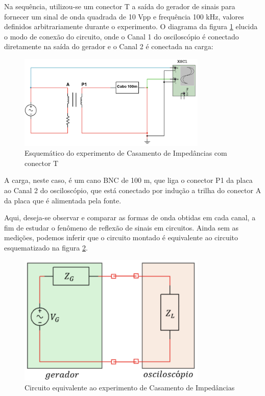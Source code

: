 \documentclass[12pt]{article}
\begin{document}
Na sequência, utilizou-se um conector T a saída do gerador de sinais
para fornecer um sinal de onda quadrada de 10 Vpp e frequência 100
kHz, valores definidos arbitrariamente durante o experimento. O
diagrama da figura \ref{fig:img/circuito3.png} elucida o modo de
conexão do circuito, onde o Canal 1
do osciloscópio é conectado diretamente na saída do gerador e o Canal
2 é conectada na carga:

\begin{figure}[H]
  \centering
  \includegraphics[width=0.8\textwidth]{img/circuito3.png}
  \caption{Esquemático do experimento de Casamento de Impedâncias com
  conector T}
  \label{fig:img/circuito3.png}
\end{figure}

A carga, neste caso, é um cano BNC de 100 m, que liga o conector P1
da placa ao Canal 2 do osciloscópio, que está conectado por indução a
trilha do conector A da placa que é alimentada pela fonte.

Aqui, deseja-se observar e comparar as formas de onda obtidas em cada
canal, a fim de estudar o fenômeno de reflexão de sinais em
circuitos. Ainda sem as medições, podemos inferir que o circuito
montado é equivalente ao circuito esquematizado na figura
\ref{fig:img/circuito4.png}.

\begin{figure}[H]
  \centering
  \includegraphics[width=0.8\textwidth]{img/circuito4.png}
  \caption{Circuito equivalente ao experimento de Casamento de Impedâncias}
  \label{fig:img/circuito4.png}
\end{figure}
\end{document}
